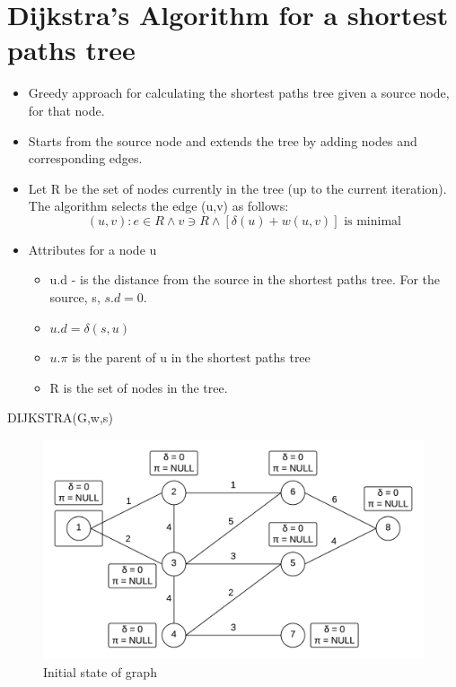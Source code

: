 \documentclass[12pt,letterpaper]{article}
\begin{document}
\section{Dijkstra's Algorithm for a shortest paths tree}
\begin{itemize}
\item Greedy approach for calculating the shortest paths tree given a source node, for that node. 
\item Starts from the source node and extends the tree by adding nodes and corresponding edges.
\item Let R be the set of nodes currently in the tree (up to the current iteration). The algorithm selects the edge (u,v) as follows:
\[(u,v):e\in R \wedge v \ni R \wedge [\delta (u) +w(u,v)] \text{ is minimal} \] 
\item Attributes for a node u
\begin{itemize}
\item u.d - is the distance from the source in the shortest paths tree. For the source, s, $s.d=0$.
\item $u.d=\delta(s,u)$
\item $u.\pi$ is the parent of u in the shortest paths tree
\item R is the set of nodes in the tree.
\end{itemize}
\end{itemize}
\begin{algorithm}[h]
DIJKSTRA(G,w,s)
\end{algorithm}

\begin{figure}
\centering
\includegraphics[width=12cm]{d0}
\caption{Initial state of graph}
\end{figure}
\end{document}
